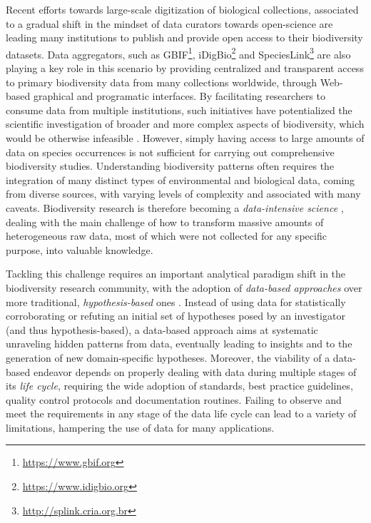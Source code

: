 Recent efforts towards large-scale digitization of biological collections, associated to a gradual shift in the mindset of data curators towards open-science are leading many institutions to publish and provide open access to their biodiversity datasets.
Data aggregators, such as GBIF\footnote{\url{https://www.gbif.org}}, iDigBio\footnote{\url{https://www.idigbio.org}} and SpeciesLink\footnote{\url{http://splink.cria.org.br}} are also playing a key role in this scenario by providing centralized and transparent access to primary biodiversity data from many collections worldwide, through Web-based graphical and programatic interfaces.
By facilitating researchers to consume data from multiple institutions, such initiatives have potentialized the scientific investigation of broader and more complex aspects of biodiversity, which would be otherwise infeasible \cite{James2018, Newbold2015}.
However, simply having access to large amounts of data on species occurrences is not sufficient for carrying out comprehensive biodiversity studies.
Understanding biodiversity patterns often requires the integration of many distinct types of environmental and biological data, coming from diverse sources, with varying levels of complexity and associated with many caveats.
Biodiversity research is therefore becoming a \textit{data-intensive science} \cite{Kelling2009}, dealing with the main challenge of how to transform massive amounts of heterogeneous raw data, most of which were not collected for any specific purpose, into valuable knowledge.

Tackling this challenge requires an important analytical paradigm shift in the biodiversity research community, with the adoption of \textit{data-based approaches} over more traditional, \textit{hypothesis-based} ones \cite{Kelling2009}.
Instead of using data for statistically corroborating or refuting an initial set of hypotheses posed by an investigator (and thus hypothesis-based), a data-based approach aims at systematic unraveling hidden patterns from data, eventually leading to insights and to the generation of new domain-specific hypotheses.
%
Moreover, the viability of a data-based endeavor depends on properly dealing with data during multiple stages of its \textit{life cycle}, requiring the wide adoption of standards, best practice guidelines, quality control protocols and documentation routines.
Failing to observe and meet the requirements in any stage of the data life cycle can lead to a variety of limitations, hampering the use of data for many applications.

